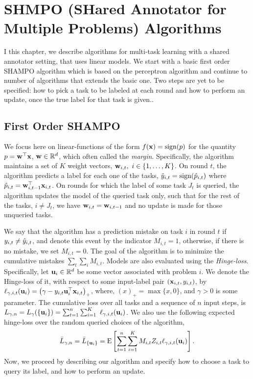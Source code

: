 \chapter{SHMPO (SHared Annotator for Multiple Problems) Algorithms}

I this chapter, we describe algorithms for multi-task learning with
a shared annotator setting, that uses linear models. We start with a basic first order SHAMPO algorithm 
which is based on the perceptron algorithm 
and continue to number of algorithms that extends the basic one. Two steps are
yet to be specified: how to pick a task to be labeled at each round and how to
perform an update, once the true label for that task is given.. 

\section{First Order SHAMPO}

We focus here on linear-functions of the form $f(\mathbf{x})={\rm sign}(p)$ for the
quantity $p={\mathbf{w}}^{\top}\mathbf{x}$, $\mathbf{w}\in\mathbb{R}^d$,  which often called the
\textit{margin}.
Specifically, the algorithm maintains a set of $K$ weight
vectors, $\mathbf{w}_{i,t},~i\in\left\{{1, \ldots , K}\right\}$. On round $t$, the algorithm predicts a label for each
 one of the tasks, $\hat{y}_{i,t}={\rm sign}(\hat{p}_{i,t})$ where $\hat{p}_{i,t}={\mathbf{w}}^{\top}_{i,t-1}\mathbf{x}_{i,t}$. 
 On rounds for which the label of some task $J_t$ is queried, the algorithm updates the model of the
 queried task only, such that for the rest of the tasks, $i\neq J_t$, we have $\mathbf{w}_{i,t}=\mathbf{w}_{i,t-1}$ and no
 update is made for those unqueried tasks.       

We say that the algorithm has a prediction mistake on task $i$ in round $t$ if
$y_{i,t} \neq \hat{y}_{i,t}$, and denote this event by the indicator $M_{i,t}=1$,
otherwise, if there is no mistake, we set $M_{i,t}=0$. The goal of the
algorithm is to minimize the cumulative mistakes $\sum_t \sum_i
M_{i,t}$. Models are also evaluated using the
{\em Hinge-loss}. Specifically, let $\mathbf{u}_{i}\in\mathbb{R}^d$ be some vector
associated with problem $i$. We denote the Hinge-loss of it, with respect
to some input-label  pair $\left({\mathbf{x}_{i,t},y_{i,t}}\right)$, by
$\ell_{\gamma,i,t}(\mathbf{u}_{i})= \left({\gamma-y_{i,t}
  {\mathbf{u}}^{\top}_{i}\mathbf{x}_{i,t}}\right)_+$, where, $(x)_+=\max\{x,0\}$, and $\gamma>0$ is
some parameter. The cumulative loss over all tasks and a sequence of
$n$ input steps, is
$ L_{\gamma,n} =L_{\gamma}(\{ \vui{i} \})=\sum_{t=1}^{n} \sum_{i=1}^{K}\ {\lossp{\gamma,i,t}(\vui{i})}$.
We also use the following expected hinge-loss over the random queried choices
of the algorithm, 
\begin{equation*}
\bar{L}_{\gamma,n}=\bar{L}_{ \{ \mathbf{u}_{i}\}}
={\rm E}\left[{\sum_{t=1}^n \sum_{i=1}^{K}{M_{i,t}Z_{i,t}\ell_{\gamma,i,t}(\mathbf{u}_{i})}}\right]. 
 \end{equation*}
Now, we proceed by  describing our algorithm and specify how to choose a task to query its label,
 and how to perform an update.
 

